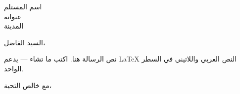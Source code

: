 \documentclass[12pt]{letter}
\begin{document}
\begin{letter}{اسم المستلم\\عنوانه\\المدينة}
\opening{السيد الفاضل،}

نص الرسالة هنا. اكتب ما تشاء — يدعم \textenglish{LaTeX} النص العربي
واللاتيني في السطر الواحد.

\closing{مع خالص التحية،}
\end{letter}
\end{document}
